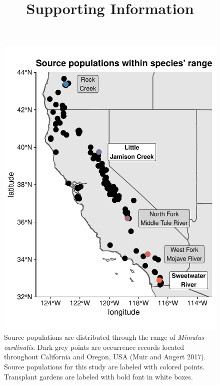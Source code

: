 \documentclass[
  12pt,
]{article}
\title{Supporting Information}
\author{}
\date{\vspace{-2.5em}}
\makeatletter
\newcommand\iraggedright{%
  \let\\\@centercr\@rightskip\@flushglue \rightskip\@rightskip
  \leftskip\z@skip}
\makeatother
\begin{document}
\maketitle

\iraggedright

\newcommand{\pkg}[1]{{\fontseries{b}\selectfont #1}} 

\renewcommand\thefigure{S\arabic{figure}}    
\renewcommand\thetable{S\arabic{table}}    
\setcounter{figure}{0}    
\setcounter{table}{0}

\begin{figure}[ht]
  \includegraphics{figures/range-map.pdf}
  \caption{Source populations are distributed through the range of \textit{Mimulus cardinalis}. Dark grey points are occurrence records located throughout California and Oregon, USA (Muir and Angert 2017). Source populations for this study are labeled with colored points. Transplant gardens are labeled with bold font in white boxes.}
  \label{fig:range-map}
\end{figure}
\end{document}
